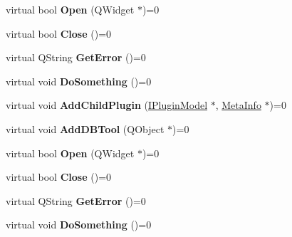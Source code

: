 \begin{DoxyCompactItemize}
\item 
virtual bool {\bfseries Open} (Q\+Widget $\ast$)=0\hypertarget{class_i_plugin_model_ac1c51202f69db707ca56e8f3c78ce163}{}\label{class_i_plugin_model_ac1c51202f69db707ca56e8f3c78ce163}

\item 
virtual bool {\bfseries Close} ()=0\hypertarget{class_i_plugin_model_a3f9ce2298f73283fec68fc908db14e57}{}\label{class_i_plugin_model_a3f9ce2298f73283fec68fc908db14e57}

\item 
virtual Q\+String {\bfseries Get\+Error} ()=0\hypertarget{class_i_plugin_model_ad42778c15ce3e8fdb9524a6dfd61792a}{}\label{class_i_plugin_model_ad42778c15ce3e8fdb9524a6dfd61792a}

\item 
virtual void {\bfseries Do\+Something} ()=0\hypertarget{class_i_plugin_model_a377627e683f892ffda2c6225d975251b}{}\label{class_i_plugin_model_a377627e683f892ffda2c6225d975251b}

\item 
virtual void {\bfseries Add\+Child\+Plugin} (\hyperlink{class_i_plugin_model}{I\+Plugin\+Model} $\ast$, \hyperlink{struct_meta_info}{Meta\+Info} $\ast$)=0\hypertarget{class_i_plugin_model_aff406b0571f6dc77488c315e0df0f563}{}\label{class_i_plugin_model_aff406b0571f6dc77488c315e0df0f563}

\item 
virtual void {\bfseries Add\+D\+B\+Tool} (Q\+Object $\ast$)=0\hypertarget{class_i_plugin_model_a2db1262756c4a587fd6cd2d7191841fb}{}\label{class_i_plugin_model_a2db1262756c4a587fd6cd2d7191841fb}

\item 
virtual bool {\bfseries Open} (Q\+Widget $\ast$)=0\hypertarget{class_i_plugin_model_ac1c51202f69db707ca56e8f3c78ce163}{}\label{class_i_plugin_model_ac1c51202f69db707ca56e8f3c78ce163}

\item 
virtual bool {\bfseries Close} ()=0\hypertarget{class_i_plugin_model_a3f9ce2298f73283fec68fc908db14e57}{}\label{class_i_plugin_model_a3f9ce2298f73283fec68fc908db14e57}

\item 
virtual Q\+String {\bfseries Get\+Error} ()=0\hypertarget{class_i_plugin_model_ad42778c15ce3e8fdb9524a6dfd61792a}{}\label{class_i_plugin_model_ad42778c15ce3e8fdb9524a6dfd61792a}

\item 
virtual void {\bfseries Do\+Something} ()=0\hypertarget{class_i_plugin_model_a377627e683f892ffda2c6225d975251b}{}\label{class_i_plugin_model_a377627e683f892ffda2c6225d975251b}


\end{DoxyCompactItemize}
